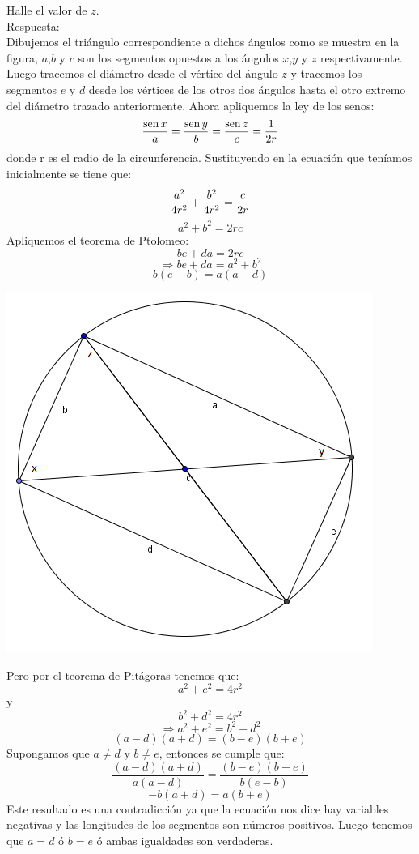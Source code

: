 \documentclass{book}
\newcommand{\sen}{\mathop{\rm sen}\nolimits} %
\begin{document}
\begin{enumerate}
Halle el valor de $z$. \\
					Respuesta:\\
					Dibujemos el triángulo correspondiente a dichos ángulos como se muestra en la figura, $a$,$b$ y $c$ son los segmentos opuestos a los ángulos $x$,$y$ y $z$ respectivamente. Luego tracemos el diámetro desde el vértice del ángulo $z$ y tracemos los segmentos $e$ y $d$ desde los vértices de los otros dos ángulos hasta el otro extremo del diámetro trazado anteriormente.
Ahora apliquemos la ley de los senos:
$${\sen {x}\over a}={\sen {y}\over b}={\sen {z}\over c}={1\over 2r}$$
donde r es el radio de la circunferencia.
Sustituyendo en la ecuación que teníamos inicialmente se tiene que:
$${a^2\over 4r^2} +{b^2\over 4r^2} ={c\over 2r}$$
$$a^2+b^2=2rc$$
Apliquemos el teorema de Ptolomeo:
$$be+da=2rc$$
$$\Rightarrow be+da=a^2+b^2$$
$$b(e-b)=a(a-d)$$
					\begin{center}
						\includegraphics[scale=1]{imagenes/Geometria/9.png}
					\end{center}
Pero por el teorema de Pitágoras tenemos que:
$$a^2+e^2=4r^2$$
y
$$b^2+d^2=4r^2$$
$$\Rightarrow a^2+e^2=b^2+d^2$$
$$(a-d)(a+d)=(b-e)(b+e)$$
Supongamos que $a\neq d$ y $b\neq e$, entonces se cumple que:
$$\frac{(a-d)(a+d)}{a(a-d)}=\frac{(b-e)(b+e)}{b(e-b)} $$
$$-b(a+d)=a(b+e)$$
Este resultado es una contradicción ya que la ecuación nos dice hay variables negativas y las longitudes de los segmentos son números positivos. Luego tenemos que $a=d$ ó $b=e$ ó ambas igualdades son verdaderas.\\

\end{enumerate}
\end{document}
